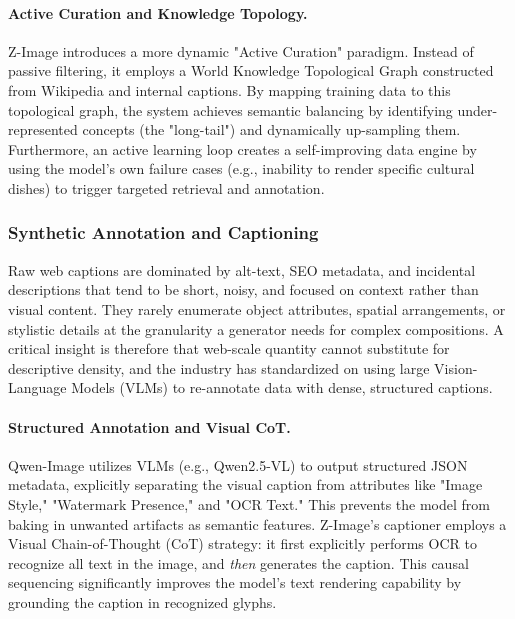\paragraph{Active Curation and Knowledge Topology.}
Z-Image introduces a more dynamic "Active Curation" paradigm. Instead of passive filtering, it employs a World Knowledge Topological Graph constructed from Wikipedia and internal captions. By mapping training data to this topological graph, the system achieves semantic balancing by identifying under-represented concepts (the "long-tail") and dynamically up-sampling them. Furthermore, an active learning loop creates a self-improving data engine by using the model's own failure cases (e.g., inability to render specific cultural dishes) to trigger targeted retrieval and annotation.

\subsubsection{Synthetic Annotation and Captioning}
Raw web captions are dominated by alt-text, SEO metadata, and incidental descriptions that tend to be short, noisy, and focused on context rather than visual content. They rarely enumerate object attributes, spatial arrangements, or stylistic details at the granularity a generator needs for complex compositions. A critical insight is therefore that web-scale quantity cannot substitute for descriptive density, and the industry has standardized on using large Vision-Language Models (VLMs) to re-annotate data with dense, structured captions.

\paragraph{Structured Annotation and Visual CoT.}
Qwen-Image utilizes VLMs (e.g., Qwen2.5-VL) to output structured JSON metadata, explicitly separating the visual caption from attributes like "Image Style," "Watermark Presence," and "OCR Text." This prevents the model from baking in unwanted artifacts as semantic features. Z-Image's captioner employs a Visual Chain-of-Thought (CoT) strategy: it first explicitly performs OCR to recognize all text in the image, and \textit{then} generates the caption. This causal sequencing significantly improves the model's text rendering capability by grounding the caption in recognized glyphs.


